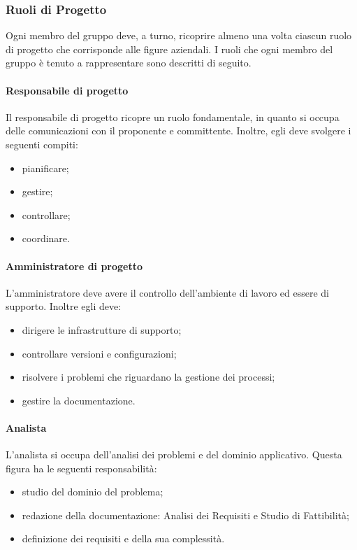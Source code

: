 \subsubsection{Ruoli di Progetto}
Ogni membro del gruppo deve, a turno, ricoprire almeno una volta ciascun ruolo di progetto che corrisponde alle figure aziendali. I ruoli che ogni membro del gruppo è tenuto a rappresentare sono descritti di seguito.

\paragraph{Responsabile di progetto}
Il responsabile di progetto ricopre un ruolo fondamentale, in quanto si occupa delle comunicazioni con il proponente e committente. Inoltre, egli deve svolgere i seguenti compiti:
\begin{itemize}
\item pianificare;
\item gestire;
\item controllare;
\item coordinare.
\end{itemize}

\paragraph{Amministratore di progetto}
L'amministratore deve avere il controllo dell'ambiente di lavoro ed essere di supporto. Inoltre egli deve: 
\begin{itemize}
\item dirigere le infrastrutture di supporto;
\item controllare versioni e configurazioni;
\item risolvere i problemi che riguardano la gestione dei processi;
\item gestire la documentazione.
\end{itemize}

\paragraph{Analista}
L'analista si occupa dell'analisi dei problemi e del dominio applicativo. Questa figura ha le seguenti responsabilità:
\begin{itemize}
\item studio del dominio del problema; 
\item redazione della documentazione: Analisi dei Requisiti e Studio di Fattibilità;
\item definizione dei requisiti e della sua complessità.
\end{itemize}

